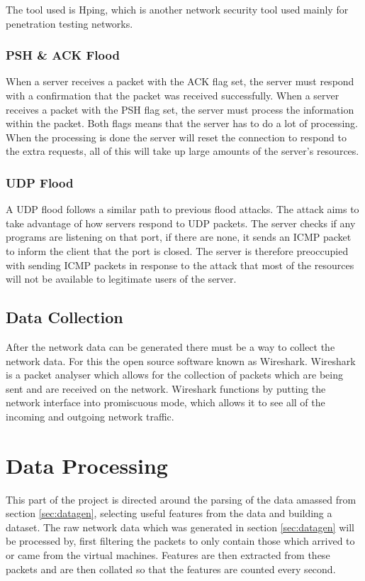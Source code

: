 The tool used is Hping, which is another network security tool used mainly for penetration testing networks.\cite{hping}

\subsubsection{PSH \& ACK Flood}
When a server receives a packet with the ACK flag set, the server must respond with a confirmation that the packet was received successfully. When a server receives a packet with the PSH flag set, the server must process the information within the packet. Both flags means that the server has to do a lot of processing. When the processing is done the server will reset the connection to respond to the extra requests, all of this will take up large amounts of the server’s resources.

\subsubsection{UDP Flood}
A UDP flood follows a similar path to previous flood attacks. The attack aims to take advantage of how servers respond to UDP packets.\cite{udp} The server checks if any programs are listening on that port, if there are none, it sends an ICMP packet to inform the client that the port is closed. The server is therefore preoccupied with sending ICMP packets in response to the attack that most of the resources will not be available to legitimate users of the server.

\subsection{Data Collection}
After the network data can be generated there must be a way to collect the network data. For this the open source software known as Wireshark. Wireshark is a packet analyser which allows for the collection of packets which are being sent and are received on the network. Wireshark functions by putting the network interface into promiscuous mode, which allows it to see all of the incoming and outgoing network traffic.
 
\section{Data Processing}\label{sec:datapro}
This part of the project is directed around the parsing of the data amassed from section \ref{sec:datagen}, selecting useful features from the data and building a dataset. The raw network data which was generated in section \ref{sec:datagen} will be processed by, first filtering the packets to only contain those which arrived to or came from the virtual machines. Features are then extracted from these packets and are then collated so that the features are counted every second.

